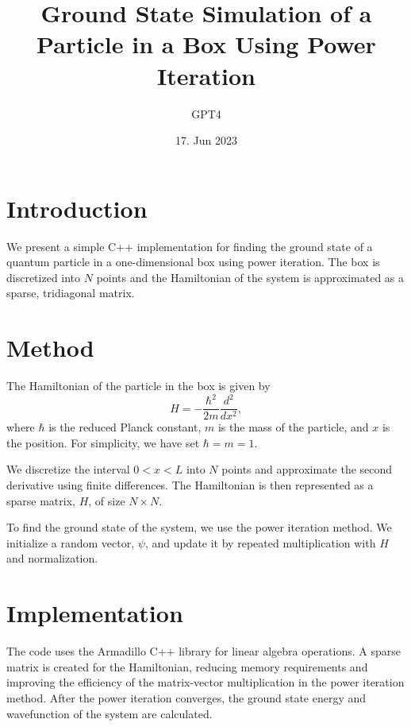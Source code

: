 \documentclass{article}
\begin{document}
\title{Ground State Simulation of a Particle in a Box Using Power Iteration}
\author{GPT4}
\date{17. Jun 2023}
\maketitle

\section{Introduction}
We present a simple C++ implementation for finding the ground state of
a quantum particle in a one-dimensional box using power iteration. The
box is discretized into $N$ points and the Hamiltonian of the system
is approximated as a sparse, tridiagonal matrix.

\section{Method}
The Hamiltonian of the particle in the box is given by
\begin{equation}
H = -\frac{{\hbar}^2}{2m} \frac{d^2}{dx^2},
\end{equation}
where $\hbar$ is the reduced Planck constant, $m$ is the mass of the
particle, and $x$ is the position. For simplicity, we have set $\hbar
= m = 1$.

We discretize the interval $0 < x < L$ into $N$ points and approximate
the second derivative using finite differences. The Hamiltonian is
then represented as a sparse matrix, $H$, of size $N \times N$.

To find the ground state of the system, we use the power iteration
method. We initialize a random vector, $\psi$, and update it by
repeated multiplication with $H$ and normalization.

\section{Implementation}
The code uses the Armadillo C++ library for linear algebra
operations. A sparse matrix is created for the Hamiltonian, reducing
memory requirements and improving the efficiency of the matrix-vector
multiplication in the power iteration method. After the power
iteration converges, the ground state energy and wavefunction of the
system are calculated.
\end{document}
